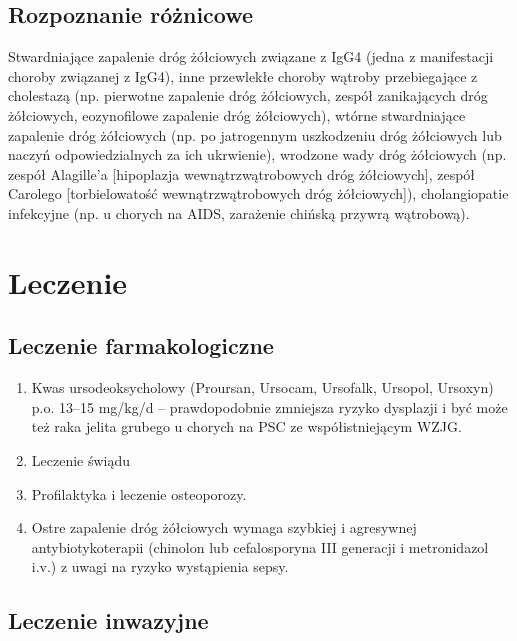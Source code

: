 \subsection{Rozpoznanie różnicowe}

Stwardniające zapalenie dróg żółciowych związane z IgG4 (jedna z manifestacji choroby związanej z IgG4), inne przewlekłe choroby wątroby przebiegające z cholestazą (np. pierwotne zapalenie dróg żółciowych, zespół zanikających dróg żółciowych, eozynofilowe zapalenie dróg żółciowych), wtórne stwardniające zapalenie dróg żółciowych (np. po jatrogennym uszkodzeniu dróg żółciowych lub naczyń odpowiedzialnych za ich ukrwienie), wrodzone wady dróg żółciowych (np. zespół Alagille’a [hipoplazja wewnątrzwątrobowych dróg żółciowych], zespół Carolego [torbielowatość wewnątrzwątrobowych dróg żółciowych]), cholangiopatie infekcyjne (np. u chorych na AIDS, zarażenie chińską przywrą wątrobową).

\section{Leczenie}

\subsection{Leczenie farmakologiczne}

\begin{enumerate}
    \item Kwas ursodeoksycholowy (Proursan, Ursocam, Ursofalk, Ursopol, Ursoxyn) p.o. 13–15 mg/kg/d – prawdopodobnie zmniejsza ryzyko dysplazji i być może też raka jelita grubego u chorych na PSC ze współistniejącym WZJG.

    \item Leczenie świądu

    \item Profilaktyka i leczenie osteoporozy.

    \item Ostre zapalenie dróg żółciowych wymaga szybkiej i agresywnej antybiotykoterapii (chinolon lub cefalosporyna III generacji i metronidazol i.v.) z uwagi na ryzyko wystąpienia sepsy.
\end{enumerate}

\subsection{Leczenie inwazyjne}

